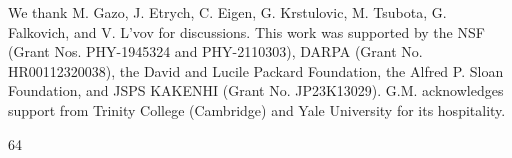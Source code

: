 \documentclass[prl,aps,twocolumn, a4paper,longbibliography,superscriptaddress]{revtex4-2}
\begin{document}
We thank M. Gazo, J. Etrych, C. Eigen, G. Krstulovic, M. Tsubota, G. Falkovich, and V. L'vov for discussions. This work was supported by the NSF (Grant Nos. PHY-1945324 and PHY-2110303), DARPA (Grant No. HR00112320038), the David and Lucile Packard Foundation, the Alfred P. Sloan Foundation, and JSPS KAKENHI (Grant No. JP23K13029). G.M. acknowledges support from Trinity College (Cambridge) and Yale University for its hospitality.









\begin{thebibliography}{64}
\makeatletter
\providecommand \@ifxundefined [1]{
 \@ifx{#1\undefined}
}
\providecommand \@ifnum [1]{
 \ifnum #1\expandafter \@firstoftwo
 \else \expandafter \@secondoftwo
 \fi
}
\providecommand \@ifx [1]{
 \ifx #1\expandafter \@firstoftwo
 \else \expandafter \@secondoftwo
 \fi
}
\providecommand \natexlab [1]{#1}
\providecommand \enquote  [1]{``#1''}
\providecommand \bibnamefont  [1]{#1}
\providecommand \bibfnamefont [1]{#1}
\providecommand \citenamefont [1]{#1}
\providecommand \href@noop [0]{\@secondoftwo}
\providecommand \href [0]{\begingroup \@sanitize@url \@href}
\providecommand \@href[1]{\@@startlink{#1}\@@href}
\providecommand \@@href[1]{\endgroup#1\@@endlink}
\providecommand \@sanitize@url [0]{\catcode `\\12\catcode `\$12\catcode
  `\&12\catcode `\#12\catcode `\^12\catcode `\_12\catcode `\%12\relax}
\providecommand \@@startlink[1]{}
\providecommand \@@endlink[0]{}
\providecommand \url  [0]{\begingroup\@sanitize@url \@url }
\providecommand \@url [1]{\endgroup\@href {#1}{\urlprefix }}
\providecommand \urlprefix  [0]{URL }
\providecommand \Eprint [0]{\href }
\providecommand \doibase [0]{https://doi.org/}
\providecommand \selectlanguage [0]{\@gobble}
\providecommand \bibinfo  [0]{\@secondoftwo}
\providecommand \bibfield  [0]{\@secondoftwo}
\providecommand \translation [1]{[#1]}
\providecommand \BibitemOpen [0]{}
\providecommand \bibitemStop [0]{}
\providecommand \bibitemNoStop [0]{.\EOS\space}
\providecommand \EOS [0]{\spacefactor3000\relax}
\providecommand \BibitemShut  [1]{\csname bibitem#1\endcsname}
\let\auto@bib@innerbib\@empty


\end{thebibliography}
\end{document}
